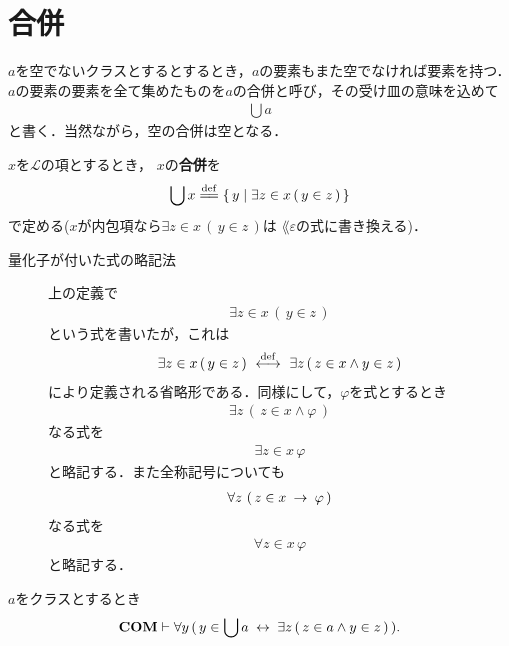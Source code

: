 \section{合併}
	$a$を空でないクラスとするとするとき，$a$の要素もまた空でなければ要素を持つ．
	$a$の要素の要素を全て集めたものを$a$の合併と呼び，その受け皿の意味を込めて
	\begin{align}
		\bigcup a
	\end{align}
	と書く．当然ながら，空の合併は空となる．
	
	\begin{screen}
		\begin{dfn}[合併]
			$x$を$\mathcal{L}$の項とするとき，
			$x$の{\bf 合併}を
			\begin{align}
				\bigcup x \defeq \Set{y}{\exists z \in x\, (\, y \in z\, )}
				\label{eq:definition_of_union_1}
			\end{align}
			で定める($x$が内包項なら$\exists z \in x\, (\, y \in z\, )$は
			$\lang{\varepsilon}$の式に書き換える)．
		\end{dfn}
	\end{screen}
	
	\begin{description}
		\item[量化子が付いた式の略記法]
		上の定義で
		\begin{align}
			\exists z \in x\, (\, y \in z\, )
		\end{align}
		という式を書いたが，これは
		\begin{align}
			\exists z \in x\, (\, y \in z\, ) \ \overset{\mathrm{def}}{\longleftrightarrow}\  
			\exists z\, (\, z \in x \wedge y \in z\, )
		\end{align}
		により定義される省略形である．同様にして，$\varphi$を式とするとき
		\begin{align}
			\exists z\, \left(\, z \in x \wedge \varphi\, \right)
		\end{align}
		なる式を
		\begin{align}
			\exists z \in x\, \varphi
		\end{align}
		と略記する．また全称記号についても
		\begin{align}
			\forall z\, \left(\, z \in x \hspace{0.25em}\rightarrow\hspace{0.25em} \varphi\, \right)
		\end{align}
		なる式を
		\begin{align}
			\forall z \in x\, \varphi
		\end{align}
		と略記する．
	\end{description}
	
	\begin{screen}
		\begin{thm}[合併の内包性]
		\label{thm:comprehension_of_unions}
			$a$をクラスとするとき
			\begin{align}
				\mbox{\bf COM} \vdash \forall y\, (\, y \in \bigcup a \hspace{0.25em}\leftrightarrow\hspace{0.25em} 
				\exists z\, (\, z \in a \wedge y \in z\, )\, ).
			\end{align}
		\end{thm}
	\end{screen}
	

